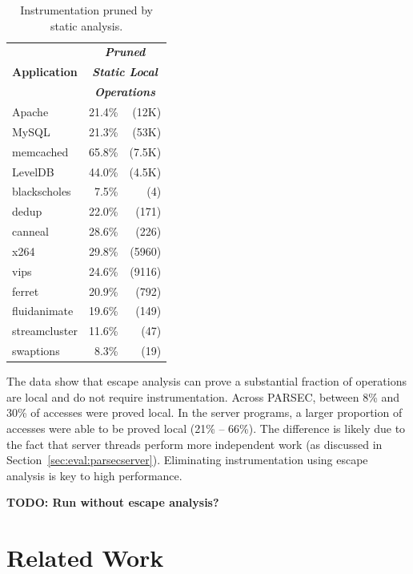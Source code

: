 \documentclass[preprint,9pt]{sigplanconf}
\begin{document}
\begin{table}
\centering
\small
\begin{tabular}{l | r r }
\multirow{3}{*}{\bf Application} & \multicolumn{2}{c}{\bf \em Pruned } \\
               & \multicolumn{2}{c}{\bf \em Static Local}  \\ 
               & \multicolumn{2}{c}{\bf \em Operations}    \\ \hline


Apache         &  21.4\%&(12K)                    \\
MySQL          &  21.3\%&(53K)                    \\
memcached      &  65.8\%&(7.5K)                   \\
LevelDB        &  44.0\%&(4.5K)                   \\ \hline
blackscholes   &   7.5\%&(4)                      \\
dedup          &   22.0\%&(171)                   \\
canneal        &   28.6\%&(226)                   \\
x264           &   29.8\%&(5960)                  \\
vips           &   24.6\%&(9116)                  \\
ferret         &   20.9\%&(792)                   \\
fluidanimate   &   19.6\%&(149)                   \\
streamcluster  &   11.6\%&(47)                    \\
swaptions      &   8.3\% &(19)                    \\
\end{tabular}
\caption{\label{tab:char}Instrumentation pruned by static analysis.}
\end{table}

The data show that escape analysis can prove a substantial fraction of
operations are local and do not require instrumentation.  Across PARSEC,
between 8\% and 30\% of accesses were proved local.  In the server programs, a
larger proportion of accesses were able to be proved local (21\% -- 66\%).  The
difference is likely due to the fact that server threads perform more
independent work (as discussed in Section~\ref{sec:eval:parsecserver}).
Eliminating instrumentation using escape analysis is key to high performance.  

{\bf TODO: Run without escape analysis?}


\section{Related Work}
\end{document}
